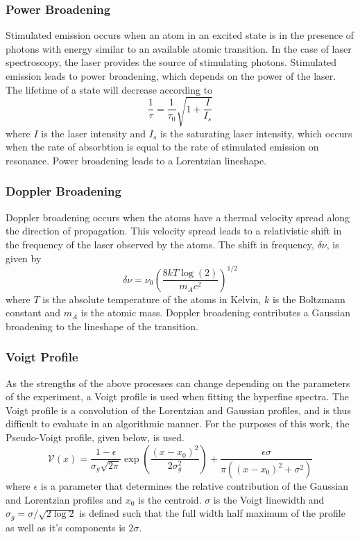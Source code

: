 \subsubsection{Power Broadening}
Stimulated emission occurs when an atom in an excited state is in the presence of photons with energy similar to an available atomic transition. In the case of laser spectroscopy, the laser provides the source of stimulating photons. Stimulated emission leads to power broadening, which depends on the power of the laser. The lifetime of a state will decrease according to
\begin{equation}
\frac{1}{\tau}= \frac{1}{\tau_0}\sqrt{1+\frac{I}{I_s}}
\end{equation}
where $I$ is the laser intensity and $I_s$ is the saturating laser intensity, which occurs when the rate of absorbtion is equal to the rate of stimulated emission on resonance. Power broadening leads to a Lorentzian lineshape.\cite{TomT}
\subsubsection{Doppler Broadening}
Doppler broadening occurs when the atoms have a thermal velocity spread along the direction of propagation. This velocity spread leads to a relativistic shift in the frequency of the laser observed by the atoms. The shift in frequency, $\delta \nu$, is given by
\begin{equation}
\delta \nu = \nu_0\left(\frac{8kT\log(2)}{m_Ac^2}\right)^{1/2}
\end{equation}
where $T$ is the absolute temperature of the atoms in Kelvin, $k$ is the Boltzmann constant and $m_A$ is the atomic mass. Doppler broadening contributes a Gaussian broadening to the lineshape of the transition.\cite{TomT}

\subsubsection{Voigt Profile}
As the strengths of the above processes can change depending on the parameters of the experiment, a Voigt profile is used when fitting the hyperfine spectra. The Voigt profile is a convolution of the Lorentzian and Gaussian profiles, and is thus difficult to evaluate in an algorithmic manner. For the purposes of this work, the Pseudo-Voigt profile, given below, is used.
\begin{equation}
\mathcal{V}(x) = \frac{1-\epsilon}{\sigma_g\sqrt{2\pi}}\exp\left(\frac{(x-x_0)^2}{2\sigma_g^2}\right)+\frac{\epsilon\sigma}{\pi((x-x_0)^2+\sigma^2)}
\end{equation}
where $\epsilon$ is a parameter that determines the relative contribution of the Gaussian and Lorentzian profiles and $x_0$ is the centroid. $\sigma$ is the Voigt linewidth and $\sigma_g = \sigma/\sqrt{2\log{2}}$ is defined such that the full width half maximum of the profile as well as it's components is $2\sigma$.\cite{voigt}
